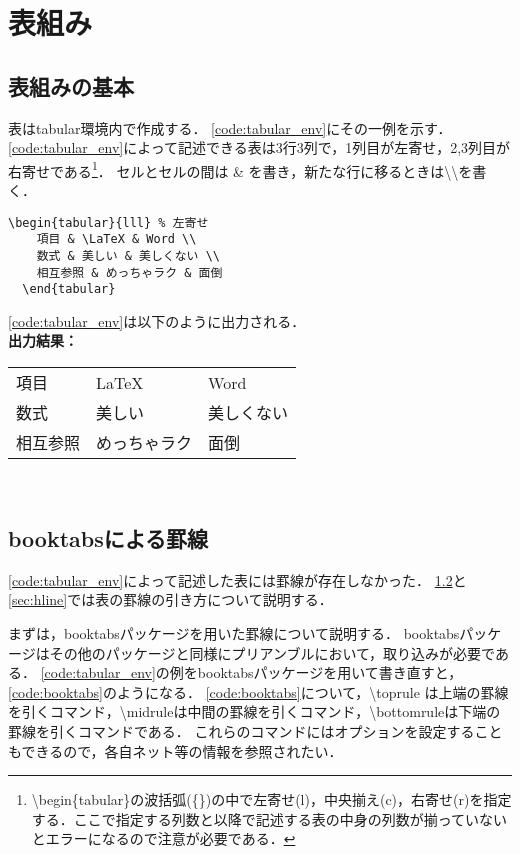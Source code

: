 \section{表組み}

\subsection{表組みの基本}

表はtabular環境内で作成する．
\code\ref{code:tabular_env}にその一例を示す．
\code\ref{code:tabular_env}によって記述できる表は3行3列で，1列目が左寄せ，2,3列目が右寄せである\footnote{\textbackslash begin\{tabular\}の波括弧(\{\})の中で左寄せ(l)，中央揃え(c)，右寄せ(r)を指定する．ここで指定する列数と以降で記述する表の中身の列数が揃っていないとエラーになるので注意が必要である．}．
セルとセルの間は \& を書き，新たな行に移るときは\textbackslash \textbackslash を書く．


\begin{lstlisting}[caption=tabular環境,label=code:tabular_env]
  \begin{tabular}{lll} % 左寄せ
    項目 & \LaTeX & Word \\
    数式 & 美しい & 美しくない \\ 
    相互参照 & めっちゃラク & 面倒
  \end{tabular}
\end{lstlisting}
  
\code\ref{code:tabular_env}は以下のように出力される．
\\ \noindent\textbf{出力結果：}\hrulefill \vspace{2mm}\\
  \begin{tabular}{lll}
    項目 & \LaTeX & Word \\
    数式 & 美しい & 美しくない \\ 
    相互参照 & めっちゃラク & 面倒
  \end{tabular}
  \vspace{2mm}
\\\noindent\hrulefill  
  

\subsection{booktabsによる罫線}
\label{sec:booktabs}

\code\ref{code:tabular_env}によって記述した表には罫線が存在しなかった．
\ref{sec:booktabs}と\ref{sec:hline}では表の罫線の引き方について説明する．

まずは，booktabsパッケージを用いた罫線について説明する．
booktabsパッケージはその他のパッケージと同様にプリアンブルにおいて，取り込みが必要である．
\code\ref{code:tabular_env}の例をbooktabsパッケージを用いて書き直すと，\code\ref{code:booktabs}のようになる．
\code\ref{code:booktabs}について，\textbackslash toprule は上端の罫線を引くコマンド，\textbackslash midruleは中間の罫線を引くコマンド，\textbackslash bottomruleは下端の罫線を引くコマンドである．
これらのコマンドにはオプションを設定することもできるので，各自ネット等の情報を参照されたい．

